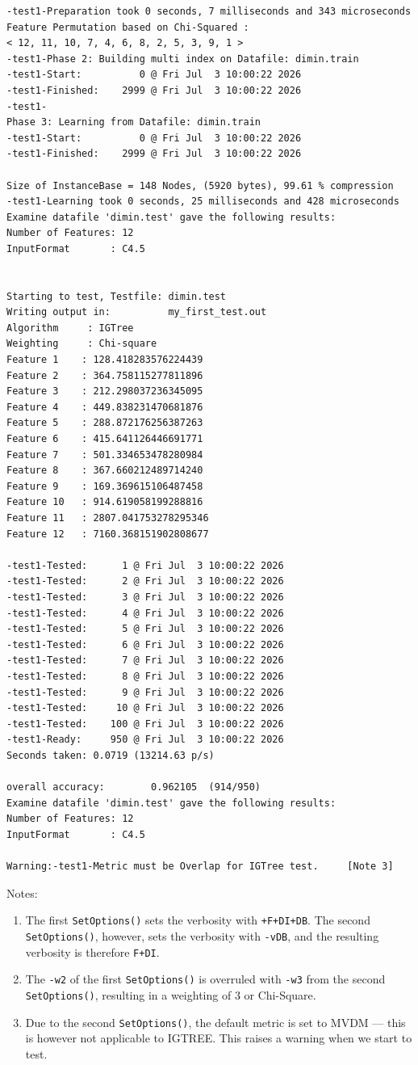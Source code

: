 \documentclass{report}
\begin{document}
\begin{footnotesize}
\begin{verbatim}
-test1-Preparation took 0 seconds, 7 milliseconds and 343 microseconds
Feature Permutation based on Chi-Squared :
< 12, 11, 10, 7, 4, 6, 8, 2, 5, 3, 9, 1 >
-test1-Phase 2: Building multi index on Datafile: dimin.train
-test1-Start:          0 @ Fri Jul  3 10:00:22 2026
-test1-Finished:    2999 @ Fri Jul  3 10:00:22 2026
-test1-
Phase 3: Learning from Datafile: dimin.train
-test1-Start:          0 @ Fri Jul  3 10:00:22 2026
-test1-Finished:    2999 @ Fri Jul  3 10:00:22 2026

Size of InstanceBase = 148 Nodes, (5920 bytes), 99.61 % compression
-test1-Learning took 0 seconds, 25 milliseconds and 428 microseconds
Examine datafile 'dimin.test' gave the following results:
Number of Features: 12
InputFormat       : C4.5


Starting to test, Testfile: dimin.test
Writing output in:          my_first_test.out
Algorithm     : IGTree
Weighting     : Chi-square
Feature 1	 : 128.418283576224439
Feature 2	 : 364.758115277811896
Feature 3	 : 212.298037236345095
Feature 4	 : 449.838231470681876
Feature 5	 : 288.872176256387263
Feature 6	 : 415.641126446691771
Feature 7	 : 501.334653478280984
Feature 8	 : 367.660212489714240
Feature 9	 : 169.369615106487458
Feature 10	 : 914.619058199288816
Feature 11	 : 2807.041753278295346
Feature 12	 : 7160.368151902808677

-test1-Tested:      1 @ Fri Jul  3 10:00:22 2026
-test1-Tested:      2 @ Fri Jul  3 10:00:22 2026
-test1-Tested:      3 @ Fri Jul  3 10:00:22 2026
-test1-Tested:      4 @ Fri Jul  3 10:00:22 2026
-test1-Tested:      5 @ Fri Jul  3 10:00:22 2026
-test1-Tested:      6 @ Fri Jul  3 10:00:22 2026
-test1-Tested:      7 @ Fri Jul  3 10:00:22 2026
-test1-Tested:      8 @ Fri Jul  3 10:00:22 2026
-test1-Tested:      9 @ Fri Jul  3 10:00:22 2026
-test1-Tested:     10 @ Fri Jul  3 10:00:22 2026
-test1-Tested:    100 @ Fri Jul  3 10:00:22 2026
-test1-Ready:     950 @ Fri Jul  3 10:00:22 2026
Seconds taken: 0.0719 (13214.63 p/s)

overall accuracy:        0.962105  (914/950)
Examine datafile 'dimin.test' gave the following results:
Number of Features: 12
InputFormat       : C4.5

Warning:-test1-Metric must be Overlap for IGTree test.     [Note 3]
\end{verbatim}
\end{footnotesize}


Notes:
\begin{enumerate}
\item The first {\tt SetOptions()} sets the verbosity with {\tt +F+DI+DB}.
The second {\tt SetOptions()}, however, sets the verbosity with {\tt -vDB}, and the resulting verbosity is therefore {\tt F+DI}.
\item The {\tt -w2} of the first {\tt SetOptions()} is overruled with
  {\tt -w3} from the second {\tt SetOptions()}, resulting in a
  weighting of 3 or Chi-Square.
\item Due to the second {\tt SetOptions()}, the default metric is set to
MVDM --- this is however not applicable to IGTREE. This raises a warning
when we start to test.
\end{enumerate}
\end{document}

